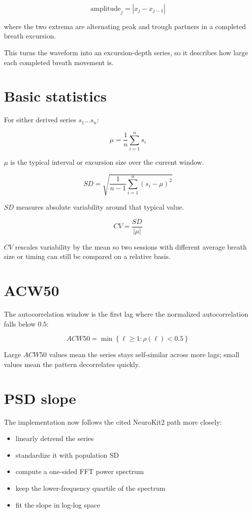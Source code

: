 \documentclass[11pt]{article}
\begin{document}
\[
\text{amplitude}_j = |x_j - x_{j-1}|
\]

where the two extrema are alternating peak and trough partners in a completed
breath excursion.

This turns the waveform into an excursion-depth series, so it describes how
large each completed breath movement is.

\section*{Basic statistics}

For either derived series $s_1 \ldots s_n$:

\[
\mu = \frac{1}{n}\sum_{i=1}^{n}s_i
\]

$\mu$ is the typical interval or excursion size over the current window.

\[
SD = \sqrt{\frac{1}{n-1}\sum_{i=1}^{n}(s_i - \mu)^2}
\]

$SD$ measures absolute variability around that typical value.

\[
CV = \frac{SD}{|\mu|}
\]

$CV$ rescales variability by the mean so two sessions with different average
breath size or timing can still be compared on a relative basis.

\section*{ACW50}

The autocorrelation window is the first lag where the normalized
autocorrelation falls below $0.5$:

\[
ACW50 = \min \left\{ \ell \ge 1 : \rho(\ell) < 0.5 \right\}
\]

Large $ACW50$ values mean the series stays self-similar across more lags; small
values mean the pattern decorrelates quickly.

\section*{PSD slope}

The implementation now follows the cited NeuroKit2 path more closely:

\begin{itemize}[leftmargin=1.5em]
\item linearly detrend the series
\item standardize it with population SD
\item compute a one-sided FFT power spectrum
\item keep the lower-frequency quartile of the spectrum
\item fit the slope in log-log space
\end{itemize}
\end{document}
